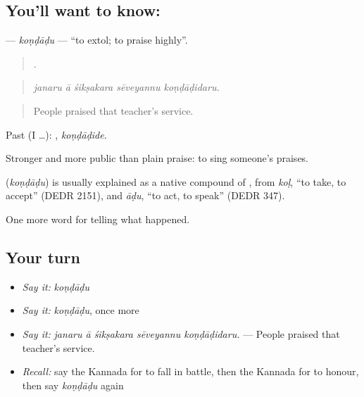\subsection*{You'll want to know: }
\textbf{} — \emph{koṇḍāḍu} — \textquotedblleft{}to extol; to praise highly\textquotedblright{}.

\begin{quote}
    .
\end{quote}

\begin{quote}
\emph{janaru ā śikṣakara sēveyannu koṇḍāḍidaru.}
\end{quote}

\begin{quote}
People praised that teacher's service.
\end{quote}

Past (I …): , \emph{koṇḍāḍide}.

Stronger and more public than plain praise: to sing someone's praises.

\begin{cousinweb}
\textbf{} (\emph{koṇḍāḍu}) is usually explained as a native compound of , from \emph{koḷ}, \textquotedblleft{}to take, to accept\textquotedblright{} (DEDR 2151), and \emph{āḍu}, \textquotedblleft{}to act, to speak\textquotedblright{} (DEDR 347).
\end{cousinweb}

\begin{grammarlens}[title={What you've built}]
One more word for telling what happened.
\end{grammarlens}

\subsection*{Your turn}
\begin{itemize}
\raggedright
  \item \emph{Say it:} \emph{koṇḍāḍu}
  \item \emph{Say it:} \emph{koṇḍāḍu}, once more
  \item \emph{Say it:} \emph{janaru ā śikṣakara sēveyannu koṇḍāḍidaru.} — People praised that teacher's service.
  \item \emph{Recall:} say the Kannada for to fall in battle, then the Kannada for to honour, then say \emph{koṇḍāḍu} again
\end{itemize}

